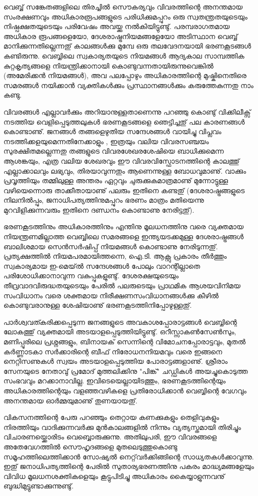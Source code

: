 വെബ്ബ് സങ്കേതങ്ങളിലെ തിരച്ചില്‍ സൌകര്യവും വിവരത്തിന്റെ അനന്തമായ സംരക്ഷണവും അധികാരരൂപങ്ങളുടെ പരിധിക്കുമപ്പുറം
 ഒരു സ്വതന്ത്രതയുടെയും നിഷ്പക്ഷതയുടെയും പരിവേഷം അവയ്ക്കു നല്‍കിയിട്ടുണ്ടു്. പരമ്പരാഗതമായ അധികാര രൂപങ്ങളെയോ, 
ദേശരാഷ്ട്രനിയമങ്ങളേയോ അടിസ്ഥാന വെബ്ബ് മാനിക്കുന്നതില്ലെന്നതു് കാലങ്ങള്‍ക്കു മുമ്പേ ഒരു തലവേദനയായി ഭരണകൂടങ്ങള്‍ 
കണ്ടിരുന്നു. വെബ്ബിലെ സ്വകാര്യതയുടെ നിയമങ്ങള്‍ ആദ്യകാല സാമ്പത്തിക കുറ്റകൃത്യങ്ങളെ നിയന്ത്രിക്കാനായി 
കൊണ്ടുവന്നതായിരുന്നുവെങ്കില്‍ (അമേരിക്കന്‍ നിയമങ്ങള്‍), അവ പലപ്പോഴും അധികാരത്തിന്റെ മുഷ്കിനെതിരെ സമരങ്ങള്‍ 
നയിക്കാന്‍ വ്യക്തികള്‍ക്കും പ്രസ്ഥാനങ്ങള്‍ക്കും കരുത്തേകുന്നതു നാം കണ്ടു.

വിവരങ്ങള്‍ എല്ലാവര്‍ക്കും അറിയാനുള്ളതാണെന്നു പറഞ്ഞു കൊണ്ടു് വിക്കിലീക്സ് നടത്തിയ വെളിപ്പെടുത്തലുകള്‍ ഭരണകൂടങ്ങളെ 
ഞെട്ടിച്ചതു് പല കാരണങ്ങള്‍ കൊണ്ടാണു്. ജനങ്ങള്‍ തങ്ങളെഴുതിയ സന്ദേശങ്ങള്‍ വായിച്ചു വിപ്ലവം നടത്തിക്കളയുമെന്നതിനേക്കാളും
, ഇത്രയും വലിയ വിവരസഞ്ചയം സുരക്ഷിതമല്ലെന്നതു തങ്ങളുടെ വിവരശേഖരശേഷിയെ ബാധിക്കുമെന്ന ആശങ്കയും, എത്ര വലിയ 
ശേഖരവും ഈ വിവരവിസ്ഫോടനത്തിന്റെ കാലത്തു് എല്ലാക്കാലവും ലഭ്യവും, തിരയാവുന്നതും ആണെന്നുള്ള ബോധവുമാണു്. വാക്കും
 പ്രവൃത്തിയും തമ്മിലുള്ള അന്തരം ഏറ്റവും ചുരുക്കുകമാത്രമാണു് മുന്നോട്ടുള്ള വഴിയെന്നൊരു താക്കീതായാണു് പലരും ഇതിനെ 
കണ്ടതു് (ദേശരാഷ്ട്രങ്ങളുടെ നിലനില്‍പ്പും, ജനാധിപത്യത്തിനുമപ്പുറം ഭരണം മാത്രം മതിയെന്നു മുറവിളിക്കുന്നവരും ഇതിനെ ദണ്ഡനം 
കൊണ്ടാണു നേരിട്ടതു്).

ഭരണകൂടത്തിനും അധികാരത്തിനും എന്തിനു മൂലധനത്തിനു വരെ വ്യക്തമായ നിയന്ത്രണമില്ലാത്ത വെബ്ബിലെ സമരങ്ങളെ 
ഇന്ത്യയടക്കമുള്ള ദേശരാഷ്ട്രങ്ങള്‍ ബാലിശമായ സെന്‍സര്‍ഷിപ്പ് നിയമങ്ങള്‍ കൊണ്ടാണു നേരിടുന്നതു്. പ്രത്യക്ഷത്തില്‍ 
നിയമപരമായിത്തന്നെ, ഐ.ടി. ആക്റ്റു പ്രകാരം തീര്‍ത്തും സ്വകാര്യമായ ഇ-മെയ്ല്‍ സന്ദേശങ്ങള്‍ പോലും വാറന്റില്ലാതെ 
പരിശോധിക്കാനാവുന്ന വകുപ്പുകളുണ്ടു്. ദേശരക്ഷയുടെയും തീവ്രവാദവിരുദ്ധതയുടെയും പേരില്‍ പലരുടെയും പ്രാഥമിക 
ആശയവിനിമയ സംവിധാനം വരെ ശക്തമായ നിരീക്ഷണസംവിധാനങ്ങള്‍ക്കു കീഴില്‍ കൊണ്ടുവരാനുള്ള ശേഷിയാണു് 
ഭരണകൂടത്തിനിപ്പോഴുള്ളതു്.

പാര്‍ശ്വവത്കരിക്കപ്പെടുന്ന ജനങ്ങളുടെ അവകാശപ്പോരാട്ടങ്ങള്‍ വെബ്ബിന്റെ ലോകത്തു് വ്യക്തമായി അടയാളപ്പെടുത്തിയിട്ടുണ്ടു്. 
ഒറീസ്സാകണ്‍സേണ്‍സും, മണിപ്പൂരിലെ പ്രശ്നങ്ങളും, ബിനായക് സെന്നിന്റെ വിമോചനപ്പോരാട്ടവും, മുതല്‍ കര്‍ണ്ണാടകാ 
സര്‍ക്കാരിന്റെ ബീഫ് നിരോധനനിയമവും വരെ ഇങ്ങനെ നെറ്റിസണുകള്‍ സ്വയം അടയാളപ്പെടുത്തിയ പോരാട്ടങ്ങളാണു്. 
ശ്രീരാം സേനയുടെ നേതാവു് പ്രമോദ് മുത്തലിക്കിനു "പിങ്ക്" ചഡ്ഡികള്‍ അയച്ചുകൊടുത്ത സംഭവവും മറക്കാനാവില്ല. 
ഇവിടെയെല്ലായിടത്തും, ഭരണകൂടത്തിന്റെയും അധികാരത്തിന്റെയും വളഞ്ഞവഴികളെ പ്രതിരോധിക്കാന്‍ വെബ്ബിന്റെ വേഗവും 
അനന്തമായ ഓര്‍മ്മയുമാണു് തുണയായതു്.

വികസനത്തിന്റെ പേരു പറഞ്ഞും തെറ്റായ കണക്കുകളും തെളിവുകളും നിരത്തിയും വാദിക്കുന്നവര്‍ക്കു മുന്‍കാലങ്ങളില്‍ നിന്നും 
വ്യത്യസ്തമായി തിരിച്ചും വിചാരണയ്ക്കൊരിടം വെബ്ബൊരുക്കുന്നു. അതിലുപരി, ഈ വിവരങ്ങളെ അതേവേഗത്തില്‍ സൌഹൃദങ്ങളെ
 മുതലെടുത്തുകൊണ്ടു സമൂഹത്തിലെത്തിക്കാന്‍ സോഷ്യല്‍ നെറ്റ്‌വര്‍ക്കിങ്ങിന്റെ സാധ്യതകള്‍ക്കാവുന്നു. ഇതു് ജനാധിപത്യത്തിന്റെ 
പേരില്‍ സുതാര്യഭരണത്തിനു പകരം മാദ്ധ്യമങ്ങളേയും വിവിധ മൂലധനശക്തികളെയും കൂട്ടുപിടിച്ചു അധികാരം കൈയ്യാളുന്നവനു് 
ബുദ്ധിമുട്ടുണ്ടാക്കുന്നുണ്ടു്.

